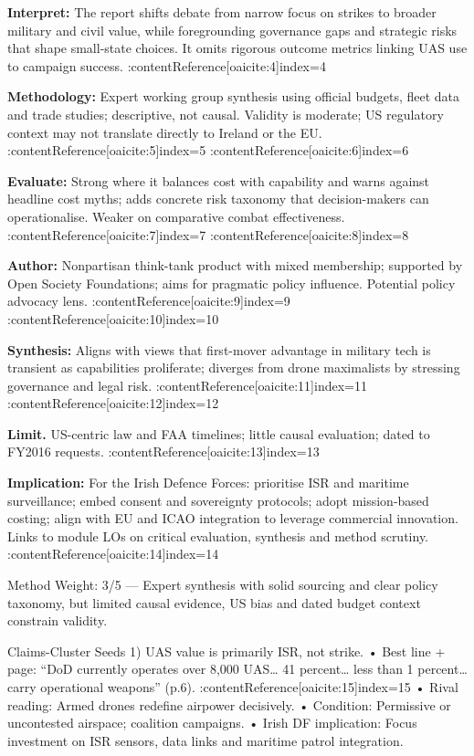 \textbf{Interpret:} The report shifts debate from narrow focus on strikes to broader military and civil value, while foregrounding governance gaps and strategic risks that shape small-state choices. It omits rigorous outcome metrics linking UAS use to campaign success. :contentReference[oaicite:4]{index=4}

\textbf{Methodology:} Expert working group synthesis using official budgets, fleet data and trade studies; descriptive, not causal. Validity is moderate; US regulatory context may not translate directly to Ireland or the EU. :contentReference[oaicite:5]{index=5} :contentReference[oaicite:6]{index=6}

\textbf{Evaluate:} Strong where it balances cost with capability and warns against headline cost myths; adds concrete risk taxonomy that decision-makers can operationalise. Weaker on comparative combat effectiveness. :contentReference[oaicite:7]{index=7} :contentReference[oaicite:8]{index=8}

\textbf{Author:} Nonpartisan think-tank product with mixed membership; supported by Open Society Foundations; aims for pragmatic policy influence. Potential policy advocacy lens. :contentReference[oaicite:9]{index=9} :contentReference[oaicite:10]{index=10}

\textbf{Synthesis:} Aligns with views that first-mover advantage in military tech is transient as capabilities proliferate; diverges from drone maximalists by stressing governance and legal risk. :contentReference[oaicite:11]{index=11} :contentReference[oaicite:12]{index=12}

\textbf{Limit.} US-centric law and FAA timelines; little causal evaluation; dated to FY2016 requests. :contentReference[oaicite:13]{index=13}

\textbf{Implication:} For the Irish Defence Forces: prioritise ISR and maritime surveillance; embed consent and sovereignty protocols; adopt mission-based costing; align with EU and ICAO integration to leverage commercial innovation. Links to module LOs on critical evaluation, synthesis and method scrutiny. :contentReference[oaicite:14]{index=14}

Method Weight: 3/5 — Expert synthesis with solid sourcing and clear policy taxonomy, but limited causal evidence, US bias and dated budget context constrain validity.

    Claims-Cluster Seeds
1) UAS value is primarily ISR, not strike.  
• Best line + page: “DoD currently operates over 8,000 UAS… 41 percent… less than 1 percent… carry operational weapons” (p.6). :contentReference[oaicite:15]{index=15}  
• Rival reading: Armed drones redefine airpower decisively.  
• Condition: Permissive or uncontested airspace; coalition campaigns.  
• Irish DF implication: Focus investment on ISR sensors, data links and maritime patrol integration.

